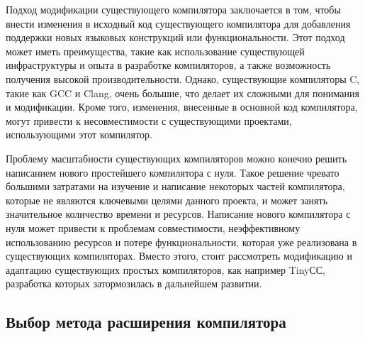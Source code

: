 Подход модификации существующего компилятора заключается в том, чтобы внести изменения в исходный код существующего компилятора для добавления поддержки новых языковых конструкций или функциональности.
Этот подход может иметь преимущества, такие как использование существующей инфраструктуры и опыта в разработке компиляторов, а также возможность получения высокой производительности.
Однако, существующие компиляторы C, такие как GCC и Clang, очень большие, что делает их сложными для понимания и модификации. Кроме того, изменения, внесенные в основной код компилятора, могут привести к несовместимости с существующими проектами, использующими этот компилятор.

Проблему масштабности существующих компиляторов можно конечно решить написанием нового простейшего компилятора с нуля.
Такое решение чревато большими затратами на изучение и написание некоторых частей компилятора, которые не являются ключевыми целями данного проекта, и может занять значительное количество времени и ресурсов.
Написание нового компилятора с нуля может привести к проблемам совместимости, неэффективному использованию ресурсов и потере функциональности, которая уже реализована в существующих компиляторах.
Вместо этого, стоит рассмотреть модификацию и адаптацию существующих простых компиляторов, как например TinyСС, разработка которых затормозилась в дальнейшем развитии.

\subsection{Выбор метода расширения компилятора}




